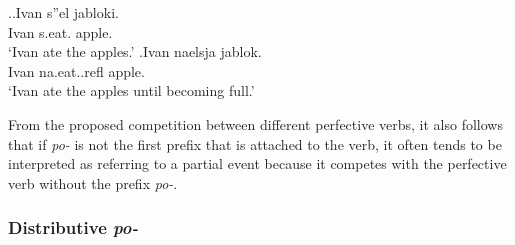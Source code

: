 \ex.\ag.\label{ex:sjest}Ivan s''el jabloki.\\
Ivan s.eat. apple.\\
\vspace{0.5em}
`Ivan ate the apples.'
\bg.\label{ex:najestsja3}Ivan naelsja jablok.\\
Ivan na.eat..refl apple.\\
\vspace{0.5em}
`Ivan ate the apples until becoming full.'

From the proposed competition between different perfective verbs, it also follows that if \textit{po-} is not the first prefix that is attached to the verb, it often tends to be interpreted as referring to a partial event because it competes with the perfective verb without the prefix \textit{po-}.



\subsubsection{Distributive \textit{po-}}

